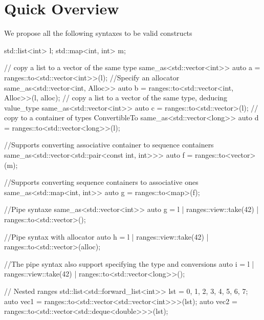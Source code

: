 \documentclass{wg21}
\begin{document}
\section{Quick Overview}
We propose all the following syntaxes to be valid constructs

\begin{colorblock}
std::list<int>  l;
std::map<int, int> m;

// copy a list to a vector of the same type
same_as<std::vector<int>> auto a = ranges::to<std::vector<int>>(l);
//Specify an allocator
same_as<std::vector<int, Alloc>> auto b = ranges::to<std::vector<int, Alloc>>(l, alloc);
// copy a list to a vector of the same type, deducing value_type
same_as<std::vector<int>> auto c = ranges::to<std::vector>(l);
// copy to a container of types ConvertibleTo
same_as<std::vector<long>> auto d = ranges::to<std::vector<long>>(l);


//Supports converting associative container to sequence containers
same_as<std::vector<std::pair<const int, int>>> auto f = ranges::to<vector>(m);

//Supports converting sequence containers to associative ones
same_as<std::map<int, int>> auto g = ranges::to<map>(f);

//Pipe syntaxe
same_as<std::vector<int>> auto g = l | ranges::view::take(42) | ranges::to<std::vector>();

//Pipe syntax with allocator
auto h = l | ranges::view::take(42) | ranges::to<std::vector>(alloc);

//The pipe syntax also support specifying the type and conversions
auto i = l | ranges::view::take(42) | ranges::to<std::vector<long>>();

// Nested ranges
std::list<std::forward_list<int>> lst = {{0, 1, 2, 3}, {4, 5, 6, 7}};
auto vec1 = ranges::to<std::vector<std::vector<int>>>(lst);
auto vec2 = ranges::to<std::vector<std::deque<double>>>(lst);

\end{colorblock}

\pagebreak
\end{document}
